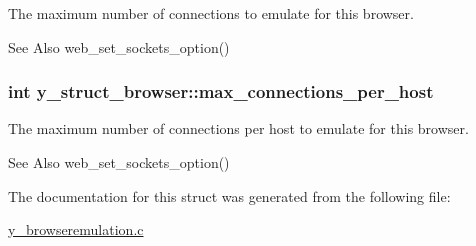 The maximum number of connections to emulate for this browser. 

\begin{DoxySeeAlso}{See Also}
web\-\_\-set\-\_\-sockets\-\_\-option() 
\end{DoxySeeAlso}
\hypertarget{structy__struct__browser_a0cf9edfc677c4e9e69b9dea4f78b5bdc}{
\subsubsection[{max\-\_\-connections\-\_\-per\-\_\-host}]{\setlength{\rightskip}{0pt plus 5cm}int y\-\_\-struct\-\_\-browser\-::max\-\_\-connections\-\_\-per\-\_\-host}}\label{structy__struct__browser_a0cf9edfc677c4e9e69b9dea4f78b5bdc}


The maximum number of connections per host to emulate for this browser. 

\begin{DoxySeeAlso}{See Also}
web\-\_\-set\-\_\-sockets\-\_\-option() 
\end{DoxySeeAlso}


The documentation for this struct was generated from the following file\-:\begin{DoxyCompactItemize}
\item 
\hyperlink{y__browseremulation_8c}{y\-\_\-browseremulation.\-c}\end{DoxyCompactItemize}
